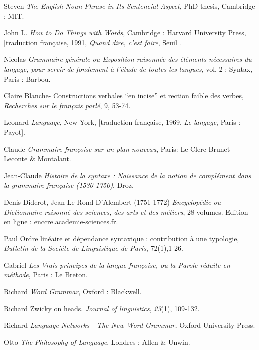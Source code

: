 {    Steven \citet{Abney1987} \textit{The English Noun Phrase in Its Sentencial Aspect}, PhD thesis, Cambridge : MIT.

    John L. \citet{Austin1962} \textit{How to Do Things with Words}, Cambridge : Harvard University Press, [traduction française, 1991, \textit{Quand dire, c’est faire}, Seuil].

    Nicolas \citet{Beauzée1767} \textit{Grammaire générale ou Exposition raisonnée des éléments nécessaires du langage, pour servir de fondement à l’étude de toutes les langues}, vol. 2 : Syntax, Paris : Barbou.

    Claire Blanche-\citet{Benveniste1989} Constructions verbales “en incise” et rection faible des verbes, \textit{Recherches sur le français parlé}, 9, 53-74.

    Leonard \citet{Bloomfield1933} \textit{Language}, New York, [traduction française, 1969, \textit{Le langage}, Paris : Payot].

    Claude \citet{Buffier1709} \textit{Grammaire françoise sur un plan nouveau}, Paris: Le Clerc-Brunet-Leconte \& Montalant.

    Jean-Claude \citet{Chevalier1968} \textit{Histoire de la syntaxe : Naissance de la notion de complément dans la grammaire française (1530-1750)}, Droz.

    Denis Diderot, Jean Le Rond D’Alembert (1751-1772) \textit{Encyclopédie ou Dictionnaire raisonné des sciences, des arts et des métiers}, 28 volumes. Edition en ligne : enccre.academie-sciences.fr.

    Paul \citet{Garde1977} Ordre linéaire et dépendance syntaxique : contribution à une typologie, \textit{Bulletin de la Sociéte de Linguistique de Paris}, 72(1),1-26.


    Gabriel \citet{Girard1747} \textit{Les Vrais principes de la langue françoise, ou la Parole réduite en méthode}, Paris : Le Breton.

    Richard \citet{Hudson1984} \textit{Word Grammar}, Oxford : Blackwell.

    Richard \citet{Hudson1987} Zwicky on heads. \textit{Journal of linguistics}, \textit{23}(1), 109-132.

    Richard \citet{Hudson2007} \textit{Language Networks - The New Word Grammar,} Oxford University Press.

    Otto \citet{Jespersen1924} \textit{The Philosophy of Language}, Londres : Allen \& Unwin.

}
